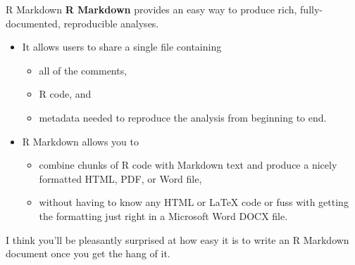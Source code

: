 \documentclass[
  ignorenonframetext,
]{beamer}
\providecommand{\tightlist}{%
  \setlength{\itemsep}{0pt}\setlength{\parskip}{0pt}}
\begin{document}
\begin{frame}{R Markdown}
\protect\hypertarget{r-markdown-1}{}
\textbf{R Markdown} provides an easy way to produce rich,
fully-documented, reproducible analyses.

\begin{itemize}
\item
  It allows users to share a single file containing

  \begin{itemize}
  \tightlist
  \item
    all of the comments,
  \item
    R code, and
  \item
    metadata needed to reproduce the analysis from beginning to end.
  \end{itemize}
\item
  R Markdown allows you to

  \begin{itemize}
  \tightlist
  \item
    combine chunks of R code with Markdown text and produce a nicely
    formatted HTML, PDF, or Word file,
  \item
    without having to know any HTML or LaTeX code or fuss with getting
    the formatting just right in a Microsoft Word DOCX file.
  \end{itemize}
\end{itemize}

I think you'll be pleasantly surprised at how easy it is to write an R
Markdown document once you get the hang of it.
\end{frame}
\end{document}

